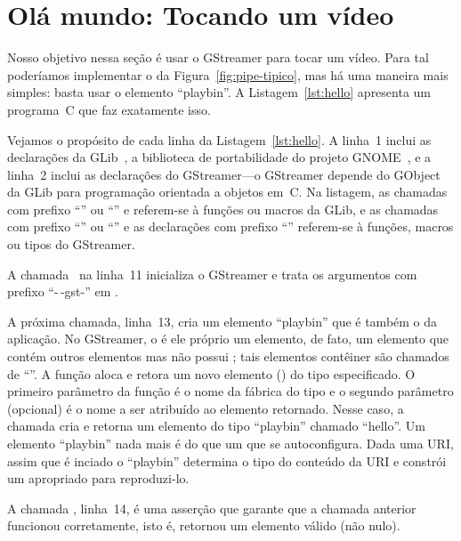 \documentclass{SBCbookchapter}
\begin{document}

\section{Olá mundo: Tocando um vídeo}
\label{sec:ola}

Nosso objetivo nessa seção é usar o GStreamer para tocar um vídeo.  Para tal
poderíamos implementar o  da Figura~\ref{fig:pipe-tipico}, mas
há uma maneira mais simples: basta usar o elemento ``playbin''.
A Listagem~\ref{lst:hello} apresenta um programa~C que faz exatamente isso.



Vejamos o propósito de cada linha da Listagem~\ref{lst:hello}.  A linha~1
inclui as declarações da GLib~\cite{glib}, a biblioteca de portabilidade do
projeto GNOME~\cite{gnome}, e a linha~2 inclui as declarações do
GStreamer---o GStreamer depende do  GObject~\cite{gobject} da
GLib para programação orientada a objetos em~C\null.  Na listagem, as
chamadas com prefixo ``'' ou ``'' e referem-se à funções ou
macros da GLib, e as chamadas com prefixo ``'' ou ``'' e as
declarações com prefixo ``'' referem-se à funções, macros ou tipos do
GStreamer.

\clearpage
A chamada~ na linha~11 inicializa o GStreamer e trata os
argumentos com prefixo ``-\,-gst-'' em .

A próxima chamada, linha~13, cria um elemento ``playbin'' que é também o
 da aplicação.  No GStreamer, o  é ele próprio um
elemento, de fato, um elemento que contém outros elementos mas não possui
; tais elementos contêiner são chamados de ``''.  A função
 aloca e retora um novo elemento
() do tipo especificado.  O primeiro parâmetro da função é o
nome da fábrica do tipo e o segundo parâmetro (opcional) é o nome a ser
atribuído ao elemento retornado.  Nesse caso, a chamada cria e retorna um
elemento do tipo ``playbin'' chamado ``hello''.  Um elemento ``playbin''
nada mais é do que um  que se autoconfigura.  Dada uma URI,
assim que é inciado o ``playbin'' determina o tipo do conteúdo da URI e
constrói um  apropriado para reproduzi-lo.

A chamada , linha~14, é uma asserção que garante que a
chamada anterior funcionou corretamente, isto é, retornou um elemento válido
(não nulo).
\end{document}
